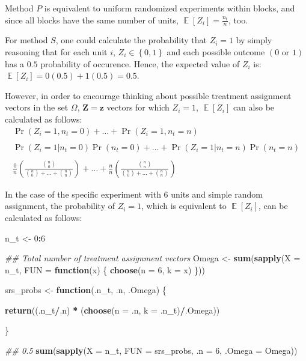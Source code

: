 \documentclass[
  12pt,
  leqno]{article}
\newenvironment{Shaded}{\begin{snugshade}}{\end{snugshade}}
\newcommand{\CommentTok}[1]{\textcolor[rgb]{0.56,0.35,0.01}{\textit{#1}}}
\newcommand{\ControlFlowTok}[1]{\textcolor[rgb]{0.13,0.29,0.53}{\textbf{#1}}}
\newcommand{\DataTypeTok}[1]{\textcolor[rgb]{0.13,0.29,0.53}{#1}}
\newcommand{\DecValTok}[1]{\textcolor[rgb]{0.00,0.00,0.81}{#1}}
\newcommand{\KeywordTok}[1]{\textcolor[rgb]{0.13,0.29,0.53}{\textbf{#1}}}
\newcommand{\NormalTok}[1]{#1}
\newcommand{\OperatorTok}[1]{\textcolor[rgb]{0.81,0.36,0.00}{\textbf{#1}}}
\newcommand{\StringTok}[1]{\textcolor[rgb]{0.31,0.60,0.02}{#1}}
\DeclareMathOperator{\E}{\mathbb{E}}
\begin{document}
Method \(P\) is equivalent to uniform randomized experiments within
blocks, and since all blocks have the same number of units,
\(\E\left[Z_i\right] = \frac{n_t}{n}\), too.

For method \(S\), one could calculate the probability that \(Z_i = 1\)
by simply reasoning that for each unit \(i\),
\(Z_i \in \left\{0, 1\right\}\) and each possible outcome
\(\left(0 \text{ or } 1\right)\) has a \(0.5\) probability of occurence.
Hence, the expected value of \(Z_i\) is:
\(\E\left[Z_i\right] = 0(0.5) + 1(0.5) = 0.5\).

However, in order to encourage thinking about possible treatment
assignment vectors in the set \(\Omega\), \(\mathbf{Z} = \mathbf{z}\)
vectors for which \(Z_i = 1\), \(\E\left[Z_i\right]\) can also be
calculated as follows: \begin{align*}
\Pr\left(Z_i = 1, n_t = 0\right) + \dots + \Pr\left(Z_i = 1, n_t = n\right) \\
\\
\Pr\left(Z_i = 1 | n_t = 0\right)\Pr\left(n_t = 0\right) + \dots + \Pr\left(Z_i = 1 | n_t = n\right)\Pr\left(n_t = n\right) \\
\\
\frac{0}{n}\left(\frac{{n \choose 0}}{{n \choose 0} + \dots + {n \choose n}}\right) + \dots + \frac{n}{n}\left(\frac{{n \choose n}}{{n \choose 0} + \dots + {n \choose n}}\right)
\end{align*}

In the case of the specific experiment with \(6\) units and simple
random assignment, the probability of \(Z_i = 1\), which is equivalent
to \(\E\left[Z_i\right]\), can be calculated as follows:

\begin{Shaded}
\begin{Highlighting}[]
\NormalTok{n\_t \textless{}{-}}\StringTok{ }\DecValTok{0}\OperatorTok{:}\DecValTok{6}

\CommentTok{\#\# Total number of treatment assignment vectors}
\NormalTok{Omega \textless{}{-}}\StringTok{ }\KeywordTok{sum}\NormalTok{(}\KeywordTok{sapply}\NormalTok{(}\DataTypeTok{X =}\NormalTok{ n\_t, }\DataTypeTok{FUN =} \ControlFlowTok{function}\NormalTok{(x) \{}
    \KeywordTok{choose}\NormalTok{(}\DataTypeTok{n =} \DecValTok{6}\NormalTok{, }\DataTypeTok{k =}\NormalTok{ x)}
\NormalTok{\}))}

\NormalTok{srs\_probs \textless{}{-}}\StringTok{ }\ControlFlowTok{function}\NormalTok{(.n\_t, .n, .Omega) \{}
    
    \KeywordTok{return}\NormalTok{((.n\_t}\OperatorTok{/}\NormalTok{.n) }\OperatorTok{*}\StringTok{ }\NormalTok{(}\KeywordTok{choose}\NormalTok{(}\DataTypeTok{n =}\NormalTok{ .n, }\DataTypeTok{k =}\NormalTok{ .n\_t)}\OperatorTok{/}\NormalTok{.Omega))}
    
\NormalTok{\}}

\CommentTok{\#\# 0.5}
\KeywordTok{sum}\NormalTok{(}\KeywordTok{sapply}\NormalTok{(}\DataTypeTok{X =}\NormalTok{ n\_t, }\DataTypeTok{FUN =}\NormalTok{ srs\_probs, }\DataTypeTok{.n =} \DecValTok{6}\NormalTok{, }\DataTypeTok{.Omega =}\NormalTok{ Omega))}
\end{Highlighting}
\end{Shaded}
\end{document}
